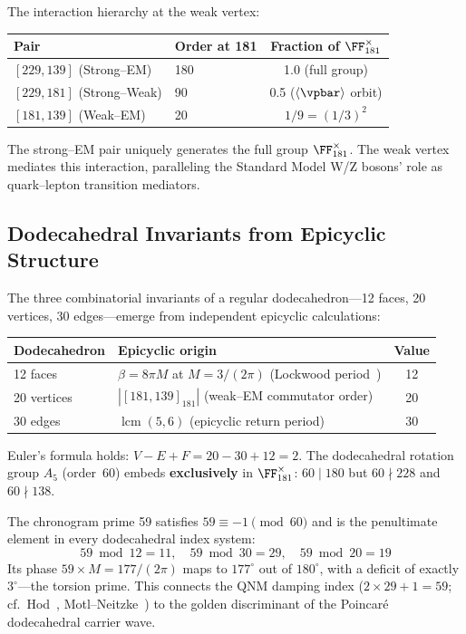 The interaction hierarchy at the weak vertex:
\begin{center}
\begin{tabular}{llc}
\hline
Pair & Order at 181 & Fraction of $\FF_{181}^{\times}$ \\
\hline
$[229, 139]$ (Strong--EM) & 180 & 1.0 (full group) \\
$[229, 181]$ (Strong--Weak) & 90 & 0.5 ($\langle\vpbar\rangle$ orbit) \\
$[181, 139]$ (Weak--EM) & 20 & $1/9 = (1/3)^2$ \\
\hline
\end{tabular}
\end{center}

The strong--EM pair uniquely generates the full group $\FF_{181}^{\times}$. The weak vertex mediates this interaction, paralleling the Standard Model W/Z bosons' role as quark--lepton transition mediators.

\subsection{Dodecahedral Invariants from Epicyclic Structure}

The three combinatorial invariants of a regular dodecahedron---12 faces, 20 vertices, 30 edges---emerge from independent epicyclic calculations:
\begin{center}
\begin{tabular}{llc}
\hline
Dodecahedron & Epicyclic origin & Value \\
\hline
12 faces & $\beta = 8\pi M$ at $M = 3/(2\pi)$ (Lockwood period~\cite{lockwood_v11}) & 12 \\
20 vertices & $|[181,139]_{181}|$ (weak--EM commutator order) & 20 \\
30 edges & $\operatorname{lcm}(5, 6)$ (epicyclic return period) & 30 \\
\hline
\end{tabular}
\end{center}

Euler's formula holds: $V - E + F = 20 - 30 + 12 = 2$. The dodecahedral rotation group $A_5$ (order~60) embeds \textbf{exclusively} in $\FF_{181}^{\times}$: $60 \mid 180$ but $60 \nmid 228$ and $60 \nmid 138$.

The chronogram prime 59 satisfies $59 \equiv -1 \pmod{60}$ and is the penultimate element in every dodecahedral index system:
\begin{equation}
    59 \bmod 12 = 11, \quad 59 \bmod 30 = 29, \quad 59 \bmod 20 = 19
\end{equation}
Its phase $59 \times M = 177/(2\pi)$ maps to $177^{\circ}$ out of $180^{\circ}$, with a deficit of exactly $3^{\circ}$---the torsion prime. This connects the QNM damping index ($2 \times 29 + 1 = 59$; cf.\ Hod~\cite{hod1998}, Motl--Neitzke~\cite{motl2003}) to the golden discriminant of the Poincar\'{e} dodecahedral carrier wave.

